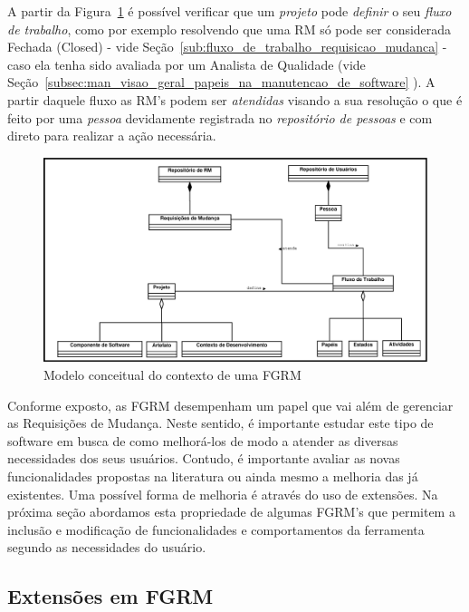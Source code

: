 A partir da Figura~\ref{fig:diagrama-classe-conceitual-fgrm} é possível
verificar que um \textit{projeto} pode \textit{definir} o seu \textit{fluxo de
	trabalho}, como por exemplo resolvendo que uma RM só pode ser considerada
Fechada (Closed) - vide Seção~\ref{sub:fluxo_de_trabalho_requisicao_mudanca} -
caso ela tenha sido avaliada por um Analista de Qualidade (vide
Seção~\ref{subsec:man_visao_geral_papeis_na_manutencao_de_software} ). A partir
daquele fluxo as RM's podem ser \textit{atendidas} visando a sua resolução o que
é feito por uma \textit{pessoa} devidamente registrada no \textit{repositório de
	pessoas} e com direto para realizar a ação necessária.

\begin{figure}[htpb] \centering
	\includegraphics[width=1.15\linewidth]{./chapter-manutencao-software-visao-geral/img/diagrama-classe-conceitual-fgrm.pdf}
	\caption{Modelo conceitual do contexto de uma FGRM}
	\label{fig:diagrama-classe-conceitual-fgrm}
\end{figure}

Conforme exposto, as FGRM desempenham um papel que vai além de gerenciar as
Requisições de Mudança. Neste sentido, é importante estudar este tipo de
software em busca de como melhorá-los de modo a atender as diversas necessidades
dos seus usuários. Contudo, é importante avaliar as novas funcionalidades
propostas na li\-te\-ra\-tu\-ra ou ainda mesmo a melhoria das já existentes. Uma
possível forma de melhoria é através do uso de extensões. Na próxima seção
abordamos esta propriedade de algumas FGRM's que permitem a inclusão e
modificação de funcionalidades e comportamentos da ferramenta segundo as
necessidades do usuário.
\todoend

\subsection{Extensões em FGRM}
\label{subsec:manutencao_visao_geral_extensoes_fgrm}

